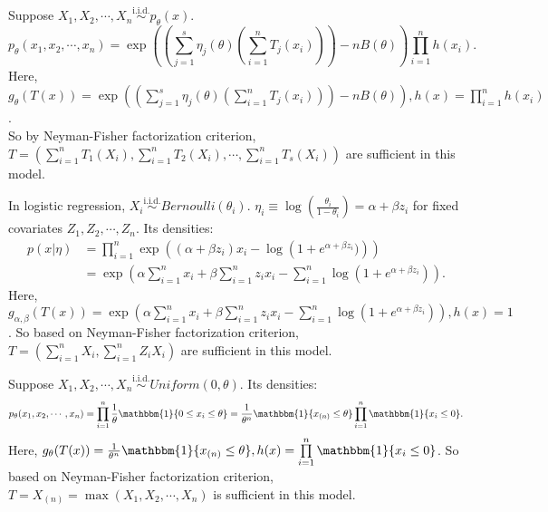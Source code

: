 \documentclass[a4paper]{article}
\begin{document}
\begin{eg}
	Suppose $X_1, X_2, \cdots , X_n \stackrel{\text{i.i.d.}}{\sim} p_\theta(x)$.
	\begin{equation*}
		p_\theta(x_1, x_2, \cdots, x_n) = \exp\left(\left(\sum\limits_{j=1}^s\eta_j(\theta)\left(\sum\limits_{i=1}^n T_j(x_i)\right)\right) - nB(\theta)\right) \prod \limits_{i=1}^n h(x_i).
	\end{equation*}
	Here, $g_\theta (T(x)) = \exp\left(\left(\sum\limits_{j=1}^s\eta_j(\theta)\left(\sum\limits_{i=1}^n T_j(x_i)\right)\right) - nB(\theta)\right), h(x) = \prod \limits_{i=1}^n h(x_i)$. \\ 
	So by Neyman-Fisher factorization criterion, $T = \left(\sum\limits_{i=1}^n T_1(X_i), \sum\limits_{i=1}^n T_2(X_i),\cdots,\sum\limits_{i=1}^n T_s(X_i)\right)$ are sufficient in this model.
\end{eg}

\begin{eg}
	In logistic regression, $X_i \stackrel{\text{i.i.d.}}{\sim} Bernoulli(\theta_i)$. $\eta_i \equiv \log\left(\frac{\theta_i}{1-\theta_i}\right) = \alpha + \beta z_i$ for fixed covariates  $Z_1, Z_2, \cdots, Z_n$. Its densities:
	\begin{equation*}
		\begin{aligned}
			p(x|\eta) &= \prod\limits_{i=1}^n \exp\left((\alpha+\beta z_i)x_i - \log\left(1+e^{\alpha+\beta z_i})\right)\right) \\
			&= \exp\left(\alpha \sum\limits_{i=1}^n x_i + \beta \sum\limits_{i=1}^n z_ix_i - \sum\limits_{i=1}^n \log(1+e^{\alpha+\beta z_i})\right).
		\end{aligned}
	\end{equation*}
	Here, $g_{\alpha, \beta}(T(x)) =  \exp\left(\alpha \sum\limits_{i=1}^n x_i + \beta \sum\limits_{i=1}^n z_ix_i - \sum\limits_{i=1}^n \log(1+e^{\alpha+\beta z_i})\right), h(x) = 1$. So based on Neyman-Fisher factorization criterion, $T = \left(\sum\limits_{i=1}^n X_i, \sum\limits_{i=1}^n Z_iX_i\right)$ are sufficient in this model.
\end{eg}

\begin{eg}
	Suppose $X_1, X_2, \cdots , X_n \stackrel{\text{i.i.d.}}{\sim} Uniform(0,\theta)$. Its densities:
	\begin{equation*}
		p_\theta(x_1,x_2,\cdots,x_n) = \prod\limits_{i=1}^n \frac{1}{\theta}\mathbbm{1}\{0 \leq x_i \leq \theta \} = \frac{1}{\theta^n}\mathbbm{1}\{x_{(n)} \leq \theta \} \prod\limits_{i=1}^n \mathbbm{1}\{x_i \leq 0 \}.
	\end{equation*}
	Here, $g_\theta(T(x)) = \frac{1}{\theta^n}\mathbbm{1}\{x_{(n)} \leq \theta \}, h(x) = \prod\limits_{i=1}^n \mathbbm{1}\{x_i \leq 0 \}$. So based on Neyman-Fisher factorization criterion, $T = X_{(n)} = \max(X_1, X_2, \cdots,X_n)$ is sufficient in this model.
\end{eg}
\end{document}
